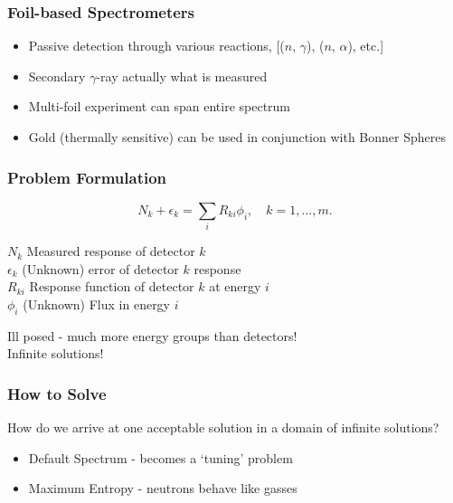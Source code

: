 \documentclass[fleqn]{beamer}
\begin{document}
\begin{frame}
\frametitle{Foil-based Spectrometers}

\begin{itemize}
\item Passive detection through various reactions, [($n$, $\gamma$), ($n$, $\alpha$), etc.]
\item Secondary $\gamma$-ray actually what is measured
\item Multi-foil experiment can span entire spectrum
\item Gold (thermally sensitive) can be used in conjunction with Bonner Spheres \cite{viererbl2012comparison}
\end{itemize}

\end{frame}

\begin{frame}
\frametitle{Problem Formulation}
\begin{equation}
\label{eqn:disc-response}
N_k + \epsilon_k = \sum_i R_{ki} \phi_i, \quad k = 1,\ldots, m .
\end{equation}

$N_k$ Measured response of detector $k$\\
$\epsilon_k$ (Unknown) error of detector $k$ response\\
$R_{ki}$ Response function of detector $k$ at energy $i$\\
$\phi_i$ (Unknown) Flux in energy $i$\\
\vspace{0.05\textheight}

Ill posed - much more energy groups than detectors!\\
Infinite solutions!

\end{frame}


\begin{frame}
\frametitle{How to Solve}

How do we arrive at one acceptable solution in a domain of infinite solutions?

\begin{itemize}
\item Default Spectrum - becomes a `tuning' problem
\item Maximum Entropy - neutrons behave like gasses
\end{itemize}

\end{frame}
\end{document}
